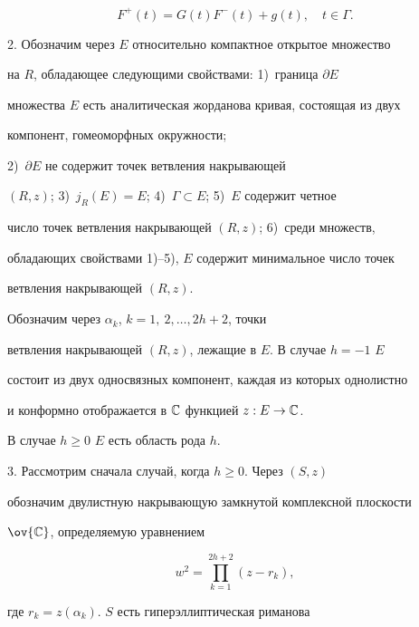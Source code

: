 \begin{equation}


F^+(t)=G(t)F^-(t)+g(t),\quad t\in \Gamma.


\end{equation}





2. Обозначим через $E$ относительно компактное открытое множество


на $R$, обладающее следующими свойствами: 1)~граница $\partial E$


множества $E$ есть аналитическая жорданова кривая, состоящая из двух


компонент, гомеоморфных окружности;


2)~$\partial E$ не содержит точек ветвления накрывающей


$(R, z)$; 3)~$j_R(E)=E$; 4)~$\Gamma \subset E$; 5)~$E$ содержит четное


число точек ветвления накрывающей $(R, z)$; 6)~среди множеств,


обладающих свойствами 1)--5), $E$ содержит минимальное число точек


ветвления накрывающей $(R, z)$.





Обозначим через $\alpha_k$, $k=1,\ 2,\dotsc, 2h+2$, точки


ветвления накрывающей $(R, z)$, лежащие в $E$. В случае $h=-1$\; $E$


состоит из двух односвязных компонент, каждая из которых однолистно


и конформно отображается в $\Bbb C$ функцией $z: E \to \Bbb C$.


В случае $h\ge 0$\; $E$ есть область рода $h$.





3. Рассмотрим сначала случай, когда $h\ge 0$. Через $(S, z)$


обозначим двулистную накрывающую замкнутой комплексной плоскости


$\ov{\Bbb C}$, определяемую уравнением


\begin{equation}


w^2=\prod_{k=1}^{2h+2}(z-r_k),


\end{equation}


где $r_k=z(\alpha_k)$.\; $S$ есть гиперэллиптическая риманова


